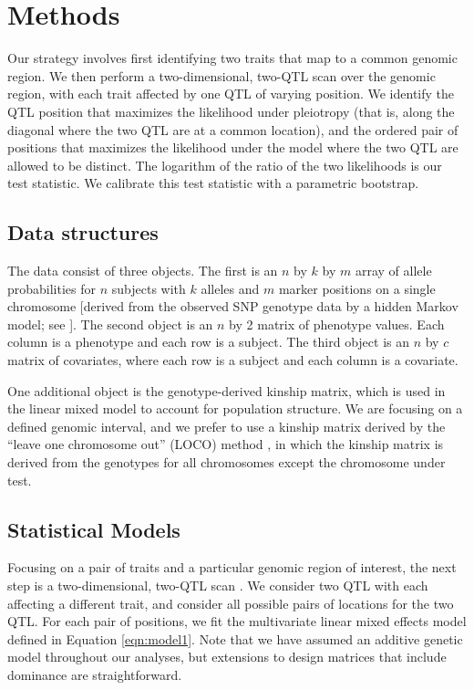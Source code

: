 \documentclass[oneside]{book}\usepackage[]{graphicx}\usepackage[]{color}
\begin{document}
\section{Methods}
\label{sec:materials:methods}

Our strategy involves first identifying two traits that map to a common
genomic region. We then perform a two-dimensional, two-QTL scan over
the genomic region, with each trait affected by one QTL of varying
position. We identify the QTL position that maximizes the likelihood
under pleiotropy (that is, along the diagonal where the two QTL are at
a common location), and the ordered pair of positions that maximizes
the likelihood under the model where the two QTL are allowed to be
distinct. The logarithm of the ratio of the two likelihoods is our
test statistic. We calibrate this test statistic with a parametric
bootstrap.

\subsection{Data structures}

The data consist of three objects. The first is an $n$ by $k$ by $m$
array of allele probabilities for $n$ subjects with $k$ alleles and
$m$ marker positions on a single chromosome [derived from the observed
SNP genotype data by a hidden Markov model; see
\citet{broman2019rqtl2}]. The second object is an $n$ by 2 matrix of
phenotype values. Each column is a phenotype and each row is a
subject. The third object is an $n$ by $c$ matrix of covariates, where
each row is a subject and each column is a covariate.

One additional object is the genotype-derived kinship matrix, which is
used in the linear mixed model to account for population structure. We
are focusing on a defined genomic interval, and we prefer to use a
kinship matrix derived by the ``leave one chromosome out'' (LOCO)
method \citep{yang2014advantages}, in which the kinship matrix is
derived from the genotypes for all chromosomes except the chromosome
under test.




\subsection{Statistical Models}

Focusing on a pair of traits and a particular genomic region of
interest, the next step is a two-dimensional, two-QTL
scan \citep{jiang1995multiple}. We consider two QTL with each
affecting a different trait, and consider all possible pairs of
locations for the two QTL. For each pair of positions, we fit
the multivariate linear mixed effects model defined in Equation
\ref{eqn:model1}. Note that we have
assumed an additive genetic model throughout our analyses, but
extensions to design matrices that include dominance are
straightforward.
\end{document}
